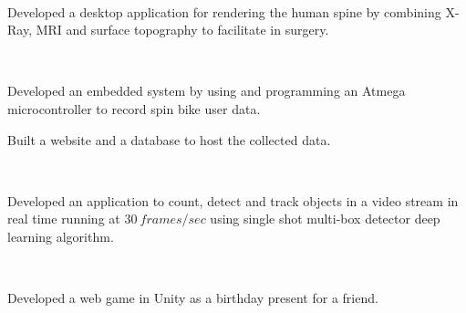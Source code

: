 \documentclass[]{sumbal-resume}
\begin{document}
\begin{minipage}[t]{0.66\textwidth}
 \\
\begin{tightemize}
\item Developed a desktop application for rendering the human spine by combining X-Ray, MRI and surface topography to facilitate in surgery. 
\end{tightemize}

 \\
\begin{tightemize}
\item Developed an embedded system by using and programming an Atmega microcontroller to record spin bike user data.
\item Built a website and a database to host the collected data.
\end{tightemize}

 \\
\begin{tightemize}
\item Developed an application to count, detect and track objects in a video stream in real time running at $30 \ frames/sec$ using single shot multi-box detector deep learning algorithm.
\end{tightemize}

 \\
\begin{tightemize}
\item Developed a web game in Unity as a birthday present for a friend.
\end{tightemize}

\end{minipage}
\end{document}
